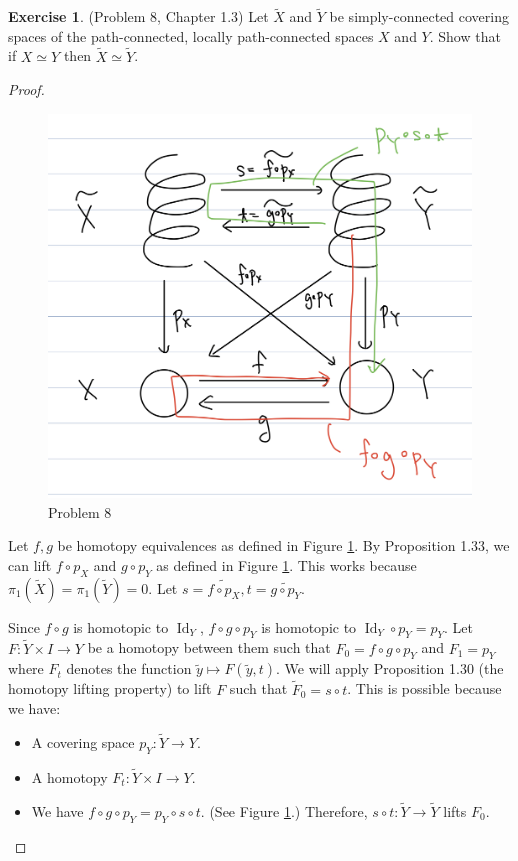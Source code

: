 \documentclass[12pt, psamsfonts]{amsart}
\theoremstyle{definition}
\newtheorem*{exer}{Exercise}
\theoremstyle{remark}
\DeclareMathOperator{\Id}{Id}
\numberwithin{equation}{section}
\begin{document}
\begin{exer}{(Problem 8, Chapter 1.3)}
  Let $\tilde{X}$ and $\tilde{Y}$ be simply-connected covering spaces of the path-connected, locally path-connected spaces $X$ and $Y$.
  Show that if $X \simeq Y$ then $\tilde{X} \simeq \tilde{Y}$.
\end{exer}

\begin{proof}
  \begin{figure}
    \includegraphics[width=.5\linewidth]{problem8_diagram.jpeg}
    \caption{Problem 8}
    \label{fig:problem8_diagram}
  \end{figure}
  Let $f, g$ be homotopy equivalences as defined in Figure \ref{fig:problem8_diagram}.
  By Proposition 1.33, we can lift $f \circ p_X$ and $g \circ p_Y$ as defined in Figure \ref{fig:problem8_diagram}.
  This works because $\pi_1(\tilde{X}) = \pi_1(\tilde{Y}) = 0$.
  Let $s = \widetilde{f \circ p_X}, t = \widetilde{g \circ p_Y}$.

  Since $f \circ g$ is homotopic to $\Id_Y$, $f \circ g \circ p_Y$ is homotopic to $\Id_Y \circ p_Y = p_Y$.
  Let $F: \tilde{Y} \times I \rightarrow Y$ be a homotopy between them such that $F_0 = f \circ g \circ p_Y$ and $F_1 = p_Y$ where $F_t$ denotes the function $\tilde{y} \mapsto F(\tilde{y}, t)$.
  We will apply Proposition 1.30 (the homotopy lifting property) to lift $F$ such that $\tilde{F}_0 = s \circ t$.
  This is possible because we have:
  \begin{itemize}
    \item
      A covering space $p_Y: \tilde{Y} \rightarrow Y$.
    \item
      A homotopy $F_t: \tilde{Y} \times I \rightarrow Y$.
    \item
      We have $f \circ g \circ p_Y = p_Y \circ s \circ t$.
      (See Figure \ref{fig:problem8_diagram}.)
      Therefore, $s \circ t: \tilde{Y} \rightarrow \tilde{Y}$ lifts $F_0$.
  \end{itemize}


\end{proof}
\end{document}
